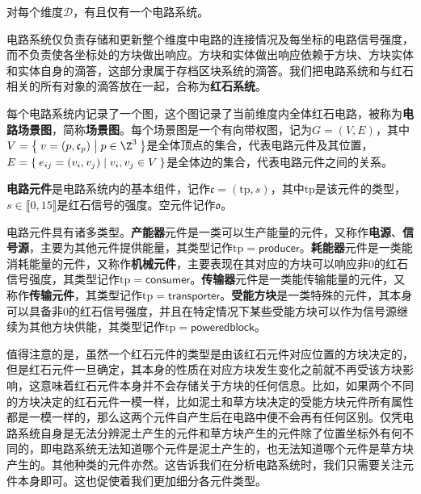 \documentclass[a4,11pt]{aleph-notas}
\begin{document}
\begin{fact}
    对每个维度$\mathcal{D}$，有且仅有一个电路系统。
\end{fact}

电路系统仅负责存储和更新整个维度中电路的连接情况及每坐标的电路信号强度，而不负责使各坐标处的方块做出响应。方块和实体做出响应依赖于方块、方块实体和实体自身的滴答，这部分隶属于存档区块系统的滴答。我们把电路系统和与红石相关的所有对象的滴答放在一起，合称为\textbf{红石系统}。

\begin{defi}
    每个电路系统内记录了一个图，这个图记录了当前维度内全体红石电路，被称为\textbf{电路场景图}，简称\textbf{场景图}。每个场景图是一个有向带权图，记为$G=(V,E)$，其中$V=\Set{v=(p,\mathfrak{c}_p)|p\in\Z^3}$是全体顶点的集合，代表电路元件及其位置，$E=\Set{e_{ij}=(v_i,v_j)|v_i,v_j\in V}$是全体边的集合，代表电路元件之间的关系。
\end{defi}

\begin{defi}
    \textbf{电路元件}是电路系统内的基本组件，记作$\mathfrak{c}=(\mathrm{tp},s)$，其中$\mathrm{tp}$是该元件的类型，$s\in\llbracket0,15\rrbracket$是红石信号的强度。空元件记作$\mathfrak{o}$。
\end{defi}

电路元件具有诸多类型。\textbf{产能器}元件是一类可以生产能量的元件，又称作\textbf{电源}、\textbf{信号源}，主要为其他元件提供能量，其类型记作$\mathrm{tp}=\mathsf{producer}$。\textbf{耗能器}元件是一类能消耗能量的元件，又称作\textbf{机械元件}，主要表现在其对应的方块可以响应非$0$的红石信号强度，其类型记作$\mathrm{tp}=\mathsf{consumer}$。\textbf{传输器}元件是一类能传输能量的元件，又称作\textbf{传输元件}，其类型记作$\mathrm{tp}=\mathsf{transporter}$。\textbf{受能方块}是一类特殊的元件，其本身可以具备非$0$的红石信号强度，并且在特定情况下某些受能方块可以作为信号源继续为其他方块供能，其类型记作$\mathrm{tp}=\mathsf{poweredblock}$。

值得注意的是，虽然一个红石元件的类型是由该红石元件对应位置的方块决定的，但是红石元件一旦确定，其本身的性质在对应方块发生变化之前就不再受该方块影响，这意味着红石元件本身并不会存储关于方块的任何信息。比如，如果两个不同的方块决定的红石元件一模一样，比如泥土和草方块决定的受能方块元件所有属性都是一模一样的，那么这两个元件自产生后在电路中便不会再有任何区别。仅凭电路系统自身是无法分辨泥土产生的元件和草方块产生的元件除了位置坐标外有何不同的，即电路系统无法知道哪个元件是泥土产生的，也无法知道哪个元件是草方块产生的。其他种类的元件亦然。这告诉我们在分析电路系统时，我们只需要关注元件本身即可。这也促使着我们更加细分各元件类型。
\end{document}
